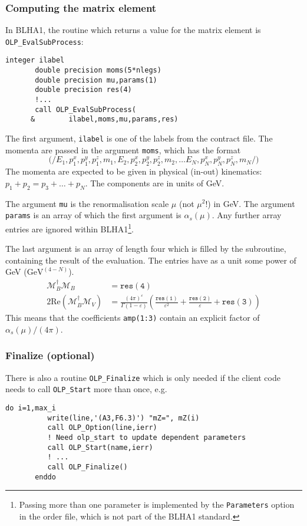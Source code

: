 \subsubsection{Computing the matrix element}

In BLHA1, the routine which returns a value for the matrix element is
\texttt{OLP\_EvalSubProcess}:
\begin{lstlisting}[columns=flexibel]
       integer ilabel
       double precision moms(5*nlegs)
       double precision mu,params(1)
       double precision res(4)
       !...
       call OLP_EvalSubProcess(
      &        ilabel,moms,mu,params,res)
\end{lstlisting}

The first argument, \texttt{ilabel} is one of the labels from the
contract file. The momenta are passed in the argument \texttt{moms},
which has the format
\begin{displaymath}
\mathtt{(/}
E_1, p^x_1, p^y_1, p^z_1, m_1,
E_2, p^x_2, p^y_2, p^z_2, m_2, \ldots
E_N, p^x_N, p^y_N, p^z_N, m_N
\mathtt{/)}
\end{displaymath}
The momenta are expected to be given in physical (in-out) 
kinematics: $p_1+p_2=p_3+\ldots+p_N$.
The components are in units of GeV.

The argument \texttt{mu} is the renormalisation scale $\mu$ (not $\mu^2$!)
in GeV. The argument {\tt params} is an array of which the first argument is
$\alpha_s(\mu)$. Any further array entries are ignored within BLHA1\footnote{
Passing more than one parameter is implemented by the \texttt{Parameters}
option in the order file, which is  not part of the BLHA1 standard.}.

The last argument is an array of length four which is filled by the subroutine, 
containing the result of the evaluation. The entries have as a unit some
power of GeV ($\mathrm{GeV}^{(4-N)}$).
\begin{align}
\label{eq:res}
\mathcal{M}_B^\dagger\mathcal{M}_B&=\mathtt{res(4)}\nonumber\\
2\mathrm{Re}\left(\mathcal{M}_B^\dagger\mathcal{M}_V\right)&=
\frac{(4\pi)^\varepsilon}{\Gamma(1-\varepsilon)}\left(
\frac{\mathtt{res(1)}}{\varepsilon^2}
+\frac{\mathtt{res(2)}}{\varepsilon}
+\mathtt{res(3)}
\right)
\end{align}
This means that the coefficients \texttt{amp(1:3)} contain
an explicit factor of $\alpha_s(\mu)/(4\pi)$.

\subsubsection{Finalize (optional)}
There is also a routine \texttt{OLP\_Finalize} which is only needed
if the client code needs to call \texttt{OLP\_Start} more than once, e.g.
\begin{lstlisting}[columns=fullflexibel]
       do i=1,max_i
          write(line,'(A3,F6.3)') "mZ=", mZ(i)
          call OLP_Option(line,ierr)
          ! Need olp_start to update dependent parameters
          call OLP_Start(name,ierr)
          ! ...
          call OLP_Finalize()
       enddo
\end{lstlisting}

